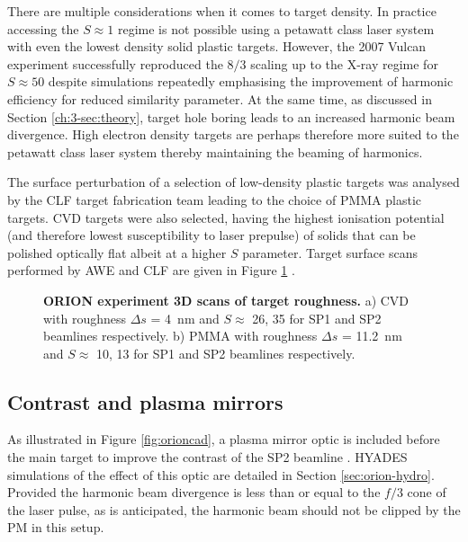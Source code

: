 There are multiple considerations when it comes to target density. In practice accessing the $S\approx 1$ regime is not possible using a petawatt class laser system with even the lowest density solid plastic targets. However, the 2007 Vulcan experiment successfully reproduced the $8/3$ scaling up to the X-ray regime for $S \approx 50 $ \cite{dromeyBrightMultikeVHarmonic2007} despite simulations repeatedly emphasising the improvement of harmonic efficiency for reduced similarity parameter. At the same time, as discussed in Section \ref{ch:3-sec:theory}, target hole boring leads to an increased harmonic beam divergence. High electron density targets are perhaps therefore more suited to the petawatt class laser system thereby maintaining the beaming of harmonics.

The surface perturbation of a selection of low-density plastic targets was analysed by the CLF target fabrication team leading to the choice of PMMA plastic targets. CVD targets were also selected, having the highest ionisation potential (and therefore lowest susceptibility to laser prepulse) of solids that can be polished optically flat albeit at a higher $S$ parameter. Target surface scans performed by AWE and CLF are given in Figure \ref{fig:oriontargets} \cite{spindloePlasticTargetsOrion2023}.
\begin{figure}
	\centering
	\caption[ORION HHG experiment targets]{\textbf{ORION experiment 3D scans of target roughness.} a) CVD with roughness $\Delta s$ = \qty{4}{nm} and $S \approx$ 26, 35 for SP1 and SP2 beamlines respectively. b) PMMA with roughness $\Delta s$ = \qty{11.2}{nm} and $S \approx$ 10, 13 for SP1 and SP2 beamlines respectively.}
	\label{fig:oriontargets}
\end{figure}

\subsection{Contrast and plasma mirrors}
As illustrated in Figure \ref{fig:orioncad}, a plasma mirror optic is included before the main target to improve the contrast of the SP2 beamline \cite{doumyCompleteCharacterizationPlasma2004}. HYADES simulations of the effect of this optic are detailed in Section \ref{sec:orion-hydro}. Provided the harmonic beam divergence is less than or equal to the $f/3$ cone of the laser pulse, as is anticipated, the harmonic beam should not be clipped by the PM in this setup. 

